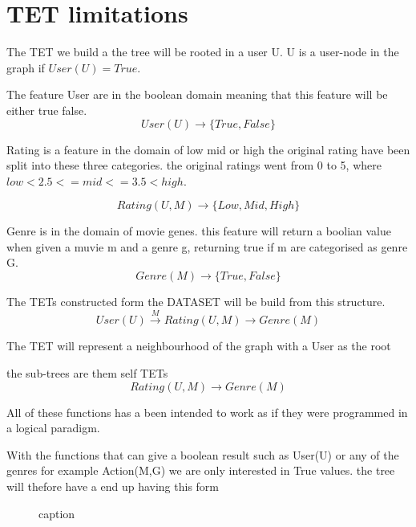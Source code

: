 \section{TET limitations}
The TET we build a the tree will be rooted in a user U.
U is a user-node in the graph if $User(U) = True$. 

The feature User are in the boolean domain meaning that this feature will be either true false.
\begin{equation}
User(U)\rightarrow \{True, False\}
\end{equation}

Rating is a feature in the domain of low mid or high the original rating have been split into these three categories.
the original ratings went from 0 to 5, where $low<2.5<=mid<=3.5<high$.

\begin{equation}
Rating(U, M) \rightarrow \{Low, Mid, High\}
\end{equation}

Genre is in the domain of movie genes. this feature will return a boolian value when given a muvie m and a genre g, returning true if m are categorised as genre G.
\begin{equation}
Genre(M) \rightarrow \{True, False\}
\end{equation}


The TETs constructed form the DATASET will be build from this structure.
\begin{equation}
User(U) \stackrel{M}{\longrightarrow} Rating(U,M) \longrightarrow Genre(M)
\end{equation}

The TET will represent a neighbourhood of the graph with a User as the root

the sub-trees are them self TETs
\begin{equation}
Rating(U,M) \longrightarrow Genre(M)
\end{equation}

All of these functions has a been intended to work as if they were programmed in a logical paradigm. 

With the functions that can give a boolean result such as User(U) or any of the genres for example Action(M,G) we are only interested in True values. the tree will thefore have a end up having this form

\begin{figure}[H]
    \centering
    
    \caption{caption}
    \label{fig:caption}
	
\end{figure}

